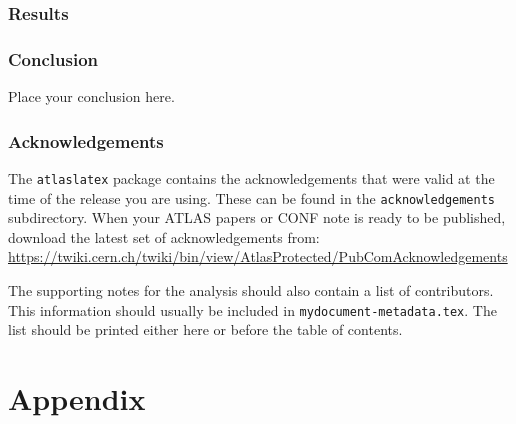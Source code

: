 \documentclass[UKenglish,texlive=2015]{latex/atlasdoc}
\begin{document}
\clearpage
\section{Results}
\label{sec:results}
%



\section{Conclusion}
\label{sec:conclusion}
%  
Place your conclusion here.


\section*{Acknowledgements}

%

The \texttt{atlaslatex} package contains the acknowledgements that were valid 
at the time of the release you are using. These can be found in the
\texttt{acknowledgements} subdirectory.
When your ATLAS papers or CONF note is ready to be published,
download the latest set of acknowledgements from:\\
\url{https://twiki.cern.ch/twiki/bin/view/AtlasProtected/PubComAcknowledgements}

The supporting notes for the analysis should also contain a list of contributors.
This information should usually be included in \texttt{mydocument-metadata.tex}.
The list should be printed either here or before the table of contents.


\clearpage
\appendix
\part*{Appendix}



\end{document}

